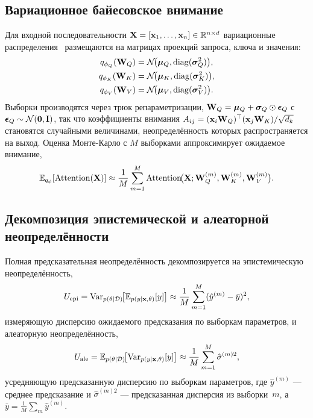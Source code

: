 \subsection{Вариационное байесовское внимание}

Для входной последовательности $\mathbf{X}=[\mathbf{x}_1,\dots,\mathbf{x}_n]\in\mathbb{R}^{n\times d}$ вариационные распределения~\cite{Blundell2015} размещаются на матрицах проекций запроса, ключа и значения:
\begin{align}
q_{\phi_Q}(\mathbf{W}_Q) &= \mathcal{N}\!\bigl(\bm{\mu}_Q,\mathrm{diag}(\bm{\sigma}_Q^2)\bigr), \notag\\
q_{\phi_K}(\mathbf{W}_K) &= \mathcal{N}\!\bigl(\bm{\mu}_K,\mathrm{diag}(\bm{\sigma}_K^2)\bigr), \notag\\
q_{\phi_V}(\mathbf{W}_V) &= \mathcal{N}\!\bigl(\bm{\mu}_V,\mathrm{diag}(\bm{\sigma}_V^2)\bigr).
\label{eq:stoch_var_attn}
\end{align}
Выборки производятся через трюк репараметризации, $\mathbf{W}_Q=\bm{\mu}_Q+\bm{\sigma}_Q\odot\bm{\epsilon}_Q$ с $\bm{\epsilon}_Q\sim\mathcal{N}(\mathbf{0},\mathbf{I})$, так что коэффициенты внимания $A_{ij}=(\mathbf{x}_i\mathbf{W}_Q)^\top(\mathbf{x}_j\mathbf{W}_K)/\sqrt{d_k}$ становятся случайными величинами, неопределённость которых распространяется на выход. Оценка Монте-Карло с $M$ выборками аппроксимирует ожидаемое внимание,
\begin{equation}
\mathbb{E}_{q_\phi}[\mathrm{Attention}(\mathbf{X})]
\approx \frac{1}{M}\sum_{m=1}^{M}
  \mathrm{Attention}\!\bigl(\mathbf{X};\mathbf{W}_Q^{(m)},\mathbf{W}_K^{(m)},\mathbf{W}_V^{(m)}\bigr).
\label{eq:stoch_mc_attn}
\end{equation}

\subsection{Декомпозиция эпистемической и алеаторной неопределённости}

Полная предсказательная неопределённость декомпозируется на эпистемическую неопределённость,
\begin{equation}
U_{\mathrm{epi}}
= \mathrm{Var}_{p(\theta|\mathcal{D})}\!\bigl[\mathbb{E}_{p(y|\mathbf{x},\theta)}[y]\bigr]
\approx \frac{1}{M}\sum_{m=1}^{M}(\hat{y}^{(m)}-\bar{y})^2,
\label{eq:stoch_epi}
\end{equation}
измеряющую дисперсию ожидаемого предсказания по выборкам параметров, и алеаторную неопределённость,
\begin{equation}
U_{\mathrm{ale}}
= \mathbb{E}_{p(\theta|\mathcal{D})}\!\bigl[\mathrm{Var}_{p(y|\mathbf{x},\theta)}[y]\bigr]
\approx \frac{1}{M}\sum_{m=1}^{M}\hat{\sigma}^{(m)2},
\label{eq:stoch_ale}
\end{equation}
усредняющую предсказанную дисперсию по выборкам параметров, где $\hat{y}^{(m)}$ --- среднее предсказание и $\hat{\sigma}^{(m)2}$ --- предсказанная дисперсия из выборки~$m$, а $\bar{y}=\frac{1}{M}\sum_m\hat{y}^{(m)}$.

